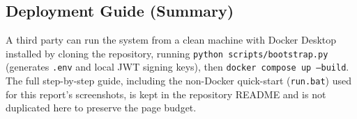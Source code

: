 \subsection{Deployment Guide (Summary)}
A third party can run the system from a clean machine with Docker Desktop
installed by cloning the repository, running
\texttt{python scripts/bootstrap.py} (generates \texttt{.env} and local JWT
signing keys), then \texttt{docker compose up --build}. The full step-by-step
guide, including the non-Docker quick-start (\texttt{run.bat}) used for this
report's screenshots, is kept in the repository README and is not duplicated
here to preserve the page budget.
